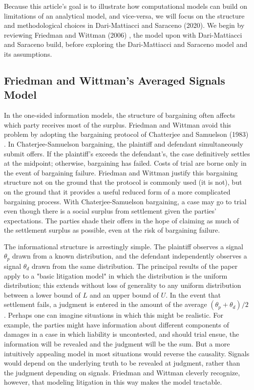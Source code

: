 \documentclass{article}
\begin{document}
Because this article's goal is to illustrate how computational models can build on limitations of an analytical model, and vice-versa, we will focus on the structure and methodological choices in Dari-Mattiacci and Saraceno (2020). We begin by reviewing Friedman and Wittman (2006) \cite{friedmanwittman}, the model upon with Dari-Mattiacci and Saraceno build, before exploring the Dari-Mattiacci and Saraceno model and its assumptions.

\subsection{Friedman and Wittman's Averaged Signals Model}

In the one-sided information models, the structure of bargaining often affects which party receives most of the surplus. Friedman and Wittman avoid this problem by adopting the bargaining protocol of Chatterjee and Samuelson (1983) \cite{chatterjeesamuelson}. In Chaterjee-Samuelson bargaining, the plaintiff and defendant simultaneously submit offers. If the plaintiff's exceeds the defendant's, the case definitively settles at the midpoint; otherwise, bargaining has failed. Costs of trial are borne only in the event of bargaining failure.  Friedman and Wittman justify this bargaining structure not on the ground that the protocol is commonly used (it is not), but on the ground that it provides a useful reduced form of a more complicated bargaining process.  With Chaterjee-Samuelson bargaining, a case may go to trial even though there is a social surplus from settlement given the parties' expectations. The parties shade their offers in the hope of claiming as much of the settlement surplus as possible, even at the risk of bargaining failure.

The informational structure is arrestingly simple. The plaintiff observes a signal $\theta_p$ drawn from a known distribution, and the defendant independently observes a signal $\theta_d$ drawn from the same distribution. The principal results of the paper apply to a "basic litigation model" in which the distribution is the uniform distribution; this extends without loss of generality to any uniform distribution between a lower bound of $L$ and an upper bound of $U$. In the event that settlement fails, a judgment is entered in the amount of the average $(\theta_p + \theta_d)/2$. Perhaps one can imagine situations in which this might be realistic. For example, the parties might have information about different components of damages in a case in which liability is uncontested, and should trial ensue, the information will be revealed and the judgment will be the sum. But a more intuitively appealing model in most situations would reverse the causality. Signals would depend on the underlying truth to be revealed at judgment, rather than the judgment depending on signals. Friedman and Wittman cleverly recognize, however, that modeling litigation in this way makes the model tractable.
\end{document}
